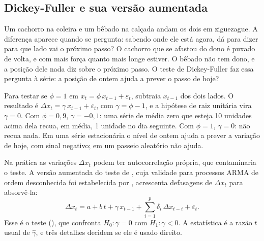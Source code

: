 \subsection{Dickey-Fuller e sua versão aumentada}

\begin{intuicao}
Um cachorro na coleira e um bêbado na calçada andam os dois em ziguezague. A diferença aparece quando se pergunta: sabendo onde ele está agora, dá para dizer para que lado vai o próximo passo? O cachorro que se afastou do dono é puxado de volta, e com mais força quanto mais longe estiver. O bêbado não tem dono, e a posição dele nada diz sobre o próximo passo. O teste de Dickey-Fuller faz essa pergunta à série: a posição de ontem ajuda a prever o passo de hoje?
\end{intuicao}

Para testar se $\phi = 1$ em $x_t = \phi\,x_{t-1} + \varepsilon_t$, subtraia $x_{t-1}$ dos dois lados. O resultado é $\Delta x_t = \gamma\,x_{t-1} + \varepsilon_t$, com $\gamma = \phi - 1$, e a hipótese de raiz unitária vira $\gamma = 0$. Com $\phi = 0,9$, $\gamma = -0,1$: uma série de média zero que esteja 10 unidades acima dela recua, em média, 1 unidade no dia seguinte. Com $\phi = 1$, $\gamma = 0$: não recua nada. Em uma série estacionária o nível de ontem ajuda a prever a variação de hoje, com sinal negativo; em um passeio aleatório não ajuda.

Na prática as variações $\Delta x_t$ podem ter autocorrelação própria, que contaminaria o teste. A versão aumentada do teste de \citet{dickey1979}, cuja validade para processos ARMA de ordem desconhecida foi estabelecida por \citet{said1984}, acrescenta defasagens de $\Delta x_t$ para absorvê-la:
\begin{equation}
  \Delta x_t = a + b\,t + \gamma\,x_{t-1} + \sum_{i=1}^{p} \delta_i\,\Delta x_{t-i} + \varepsilon_t .
  \label{eq:c06-adf}
\end{equation}
Esse é o teste  (), que confronta $H_0\colon \gamma = 0$ com $H_1\colon \gamma < 0$. A estatística é a razão $t$ usual de $\hat\gamma$, e três detalhes decidem se ele é usado direito.

